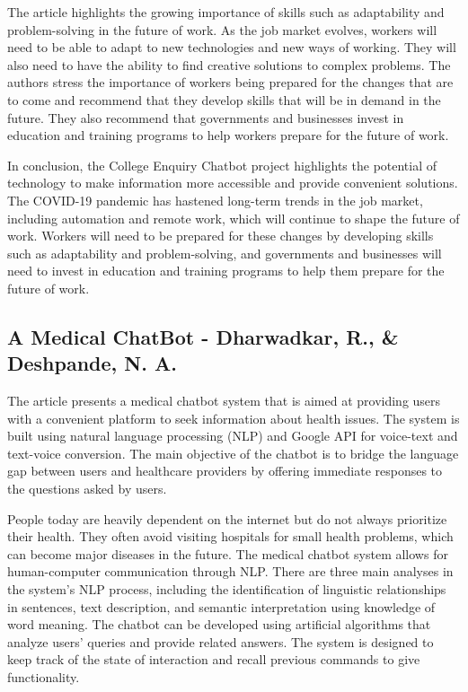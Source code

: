 \documentclass[12pt, twoside]{article}
\begin{document}
The article highlights the growing importance of skills such as adaptability and problem-solving in the future of work. As the job market evolves, workers will need to be able to adapt to new technologies and new ways of working. They will also need to have the ability to find creative solutions to complex problems. The authors stress the importance of workers being prepared for the changes that are to come and recommend that they develop skills that will be in demand in the future. They also recommend that governments and businesses invest in education and training programs to help workers prepare for the future of work.

In conclusion, the College Enquiry Chatbot project highlights the potential of technology to make information more accessible and provide convenient solutions. The COVID-19 pandemic has hastened long-term trends in the job market, including automation and remote work, which will continue to shape the future of work. Workers will need to be prepared for these changes by developing skills such as adaptability and problem-solving, and governments and businesses will need to invest in education and training programs to help them prepare for the future of work.


\subsection{A Medical ChatBot - Dharwadkar, R., \& Deshpande, N. A.\cite{5}}
The article presents a medical chatbot system that is aimed at providing users with a convenient platform to seek information about health issues. The system is built using natural language processing (NLP) and Google API for voice-text and text-voice conversion. The main objective of the chatbot is to bridge the language gap between users and healthcare providers by offering immediate responses to the questions asked by users.

People today are heavily dependent on the internet but do not always prioritize their health. They often avoid visiting hospitals for small health problems, which can become major diseases in the future. The medical chatbot system allows for human-computer communication through NLP. There are three main analyses in the system's NLP process, including the identification of linguistic relationships in sentences, text description, and semantic interpretation using knowledge of word meaning. The chatbot can be developed using artificial algorithms that analyze users' queries and provide related answers. The system is designed to keep track of the state of interaction and recall previous commands to give functionality.
\end{document}
